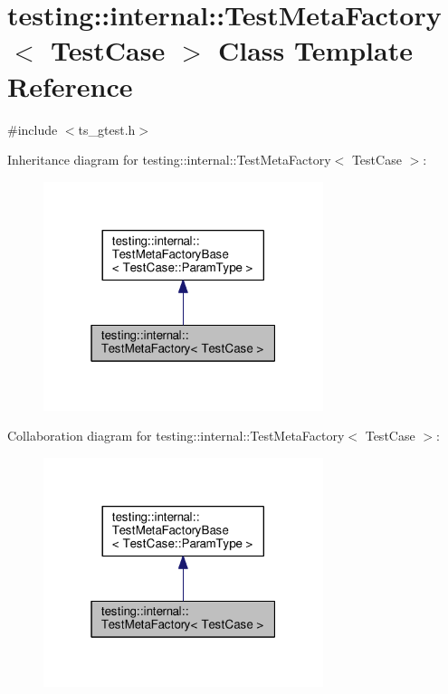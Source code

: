 \hypertarget{classtesting_1_1internal_1_1TestMetaFactory}{\section{testing\-:\-:internal\-:\-:Test\-Meta\-Factory$<$ Test\-Case $>$ Class Template Reference}
\label{classtesting_1_1internal_1_1TestMetaFactory}
}


{\ttfamily \#include $<$ts\-\_\-gtest.\-h$>$}



Inheritance diagram for testing\-:\-:internal\-:\-:Test\-Meta\-Factory$<$ Test\-Case $>$\-:\nopagebreak
\begin{figure}[H]
\begin{center}
\leavevmode
\includegraphics[width=232pt]{classtesting_1_1internal_1_1TestMetaFactory__inherit__graph}
\end{center}
\end{figure}


Collaboration diagram for testing\-:\-:internal\-:\-:Test\-Meta\-Factory$<$ Test\-Case $>$\-:\nopagebreak
\begin{figure}[H]
\begin{center}
\leavevmode
\includegraphics[width=232pt]{classtesting_1_1internal_1_1TestMetaFactory__coll__graph}
\end{center}
\end{figure}
